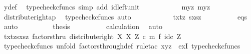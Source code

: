 \begin{isabellebody}
\ y{\isacharprime}{\kern0pt}{\isacharunderscore}{\kern0pt}def\ \isamarkupfalse%
\ {\isacharparenleft}{\kern0pt}typecheck{\isacharunderscore}{\kern0pt}cfuncs{\isacharcomma}{\kern0pt}\ simp\ add{\isacharcolon}{\kern0pt}\ id{\isacharunderscore}{\kern0pt}left{\isacharunderscore}{\kern0pt}unit{}{\isacharparenright}{\kern0pt}\isanewline
\ \ \ \ \ \ \isamarkupfalse%
\ \isamarkupfalse%
\ {\isachardoublequoteopen}{\isachardot}{\kern0pt}{\isachardot}{\kern0pt}{\isachardot}{\kern0pt}\ {\isacharequal}{\kern0pt}\ {\isasymlangle}{\isasymlangle}my{}{\isacharcomma}{\kern0pt}z{\isasymrangle}{\isacharcomma}{\kern0pt}\ {\isasymlangle}my{}{\isacharcomma}{\kern0pt}z{\isasymrangle}{\isasymrangle}{\isachardoublequoteclose}\isanewline
\ \ \ \ \ \ \ \ \isamarkupfalse%
\ distribute{\isacharunderscore}{\kern0pt}right{\isacharunderscore}{\kern0pt}ap\ \isamarkupfalse%
\ {\isacharparenleft}{\kern0pt}typecheck{\isacharunderscore}{\kern0pt}cfuncs{\isacharcomma}{\kern0pt}\ auto{\isacharparenright}{\kern0pt}\isanewline
\ \ \ \ \ \ \isamarkupfalse%
\ \isamarkupfalse%
\ {\isachardoublequoteopen}{\isachardot}{\kern0pt}{\isachardot}{\kern0pt}{\isachardot}{\kern0pt}\ {\isacharequal}{\kern0pt}\ {\isasymlangle}{\isasymlangle}tx{\isacharcomma}{\kern0pt}tz{\isasymrangle}{\isacharcomma}{\kern0pt}\ {\isasymlangle}sx{\isacharcomma}{\kern0pt}sz{\isasymrangle}{\isasymrangle}{\isachardoublequoteclose}\isanewline
\ \ \ \ \ \ \ \ \isamarkupfalse%
\ eqs\ \isamarkupfalse%
\ auto\isanewline
\ \ \ \ \ \ \isamarkupfalse%
\ \isamarkupfalse%
\ {\isacharquery}{\kern0pt}thesis\isanewline
\ \ \ \ \ \ \ \ \isamarkupfalse%
\ calculation\ \isamarkupfalse%
\ auto\isanewline
\ \ \ \ \isamarkupfalse%
\isanewline
\ \ \ \ \isamarkupfalse%
\ \isamarkupfalse%
\ {\isachardoublequoteopen}{\isasymlangle}{\isasymlangle}tx{\isacharcomma}{\kern0pt}tz{\isasymrangle}{\isacharcomma}{\kern0pt}{\isasymlangle}sx{\isacharcomma}{\kern0pt}sz{\isasymrangle}{\isasymrangle}\ factorsthru\ {\isacharparenleft}{\kern0pt}distribute{\isacharunderscore}{\kern0pt}right\ X\ X\ Z\ {\isasymcirc}\isactrlsub c\ m\ {\isasymtimes}\isactrlsub f\ id\isactrlsub c\ Z{\isacharparenright}{\kern0pt}{\isachardoublequoteclose}\isanewline
\ \ \ \ \ \ \isamarkupfalse%
\ {\isacharparenleft}{\kern0pt}typecheck{\isacharunderscore}{\kern0pt}cfuncs{\isacharcomma}{\kern0pt}\ unfold\ factors{\isacharunderscore}{\kern0pt}through{\isacharunderscore}{\kern0pt}def{}{\isacharcomma}{\kern0pt}\ rule{\isacharunderscore}{\kern0pt}tac\ x{\isacharequal}{\kern0pt}{\isachardoublequoteopen}{\isasymlangle}y{\isacharprime}{\kern0pt}{\isacharcomma}{\kern0pt}z{\isasymrangle}{\isachardoublequoteclose}\ \ exI{\isacharcomma}{\kern0pt}\ typecheck{\isacharunderscore}{\kern0pt}cfuncs{\isacharparenright}{\kern0pt}\isanewline

\end{isabellebody}
